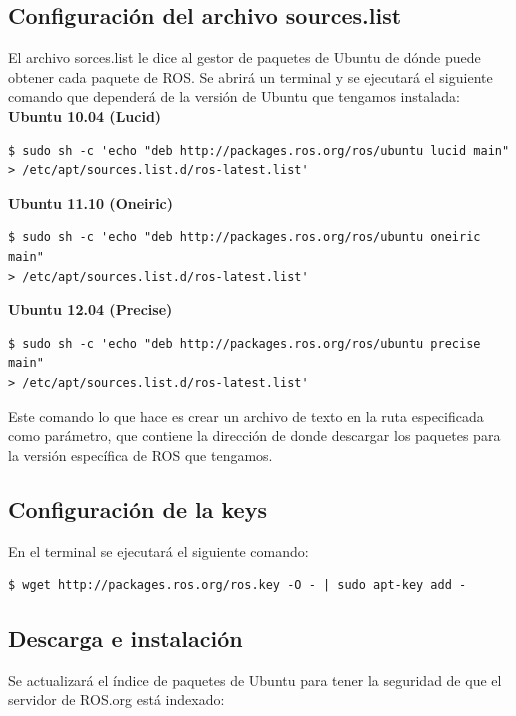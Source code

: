 \documentclass[10pt,a4paper]{report}
\begin{document}
\subsection{Configuración del archivo sources.list}

El archivo sorces.list le dice al gestor de paquetes de Ubuntu de dónde puede obtener cada paquete de ROS.
Se abrirá un terminal y se ejecutará el siguiente comando que dependerá de la versión de Ubuntu que tengamos instalada:\\

\textbf{Ubuntu 10.04 (Lucid)}
\begin{verbatim}
$ sudo sh -c 'echo "deb http://packages.ros.org/ros/ubuntu lucid main" 
> /etc/apt/sources.list.d/ros-latest.list'
\end{verbatim}

\textbf{Ubuntu 11.10 (Oneiric)}
\begin{verbatim}
$ sudo sh -c 'echo "deb http://packages.ros.org/ros/ubuntu oneiric main" 
> /etc/apt/sources.list.d/ros-latest.list'
\end{verbatim}

\textbf{Ubuntu 12.04 (Precise)}
\begin{verbatim}
$ sudo sh -c 'echo "deb http://packages.ros.org/ros/ubuntu precise main" 
> /etc/apt/sources.list.d/ros-latest.list'
\end{verbatim}

Este comando lo que hace es crear un archivo de texto en la ruta especificada como parámetro, que contiene la dirección de donde descargar los paquetes para la versión específica de ROS que tengamos.

\subsection{Configuración de la keys}

En el terminal se ejecutará el siguiente comando:

\begin{verbatim}
$ wget http://packages.ros.org/ros.key -O - | sudo apt-key add -
\end{verbatim}

\subsection{Descarga e instalación}

Se actualizará el índice de paquetes de Ubuntu para tener la seguridad de que el servidor de ROS.org está indexado:
\end{document}
